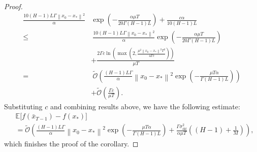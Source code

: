 \documentclass[sn-mathphys,Numbered]{sn-jnl}%
\newcommand*{\E}{{\mathbb E}}
\renewcommand{\|}{\parallel}
\newcommand\br[1]{\left ( #1 \right )}
\newcommand{\sqn}[1]{{\left\lVert#1\right\rVert}^2}
\newcommand{\sigmaf}{\sigma_{\mathrm{dif}}}
\renewcommand {\*} {\ast}
\begin{document}
\begin{proof}
    \begin{align*}
       \frac{10(H-1)L\Gamma\sqn{x_{0} - x_\ast}}{\alpha} &\exp{\br{-\frac{\alpha\mu T}{20\Gamma (H-1)L}}} +\frac{c\alpha}{10(H-1)L} \\ \leq&\ \frac{10(H-1)L\Gamma\sqn{x_{0} - x_\ast}}{\alpha} \exp{\br{-\frac{\alpha\mu T}{20\Gamma (H-1)L}}} \\ &+ \frac{2\Gamma c\ln{\br{\max{\br{2, \frac{\mu^2 \sqn{x_{0} - x_\ast} T^2}{4\Gamma c}}}}}}{\mu T} \\ =&\ \tilde{\mathcal{O}}\br{\frac{(H-1)L\Gamma}{\alpha} \sqn{x_0 - x_\ast} \exp{\br{-\frac{\mu T \alpha}{\Gamma(H-1)L}}}} \\ &+  \tilde{\mathcal{O}}\br{\frac{\Gamma c }{\mu T}}.
    \end{align*}
    Substituting $c$ and combining results above, we have the following estimate:
    \begin{align*}
        &\E\big[f(\bar{x}_{T - 1}) - f(x_\ast)\big] \\ &= \tilde{\mathcal{O}}\br{\frac{(H-1)L\Gamma}{\alpha} \sqn{x_0 - x_\ast} \exp{\br{-\frac{\mu T \alpha}{\Gamma(H-1)L}}} + \frac{\Gamma \sigmaf^2 }{\alpha \mu T} \br{(H-1)   + \frac{1}{M}}},
    \end{align*}
    which finishes the proof of the corollary.
\end{proof}
\end{document}
